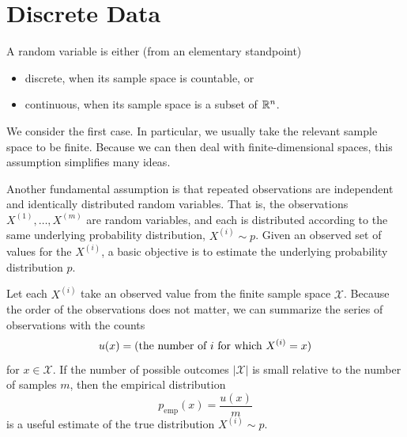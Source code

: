 \documentclass[cclicense]{hmcthesis}
\newcommand*{\x}[1]{\ensuremath{X^{(#1)}}}
\providecommand*{\xs}{\mathcal X}
\newcommand*{\emp}{\mathrm{emp}}
\numberwithin{equation}{chapter}
\numberwithin{thmcounter}{chapter}
\begin{document}
    \section{Discrete Data}

    A random variable is either (from an elementary standpoint) 
    \begin{itemize}\noparspace
    \item discrete, when its sample space is countable, or
    \item continuous, when its sample space is a subset of $\mathbb{R}^n$.
    \end{itemize}
    We consider the first case.  In particular, we usually take the relevant
    sample space to be finite.  Because we can then deal with
    finite-dimensional spaces, this assumption simplifies many ideas.

    Another fundamental assumption is that repeated observations are independent and
    identically distributed random variables.  That is, the observations $\x 1,
    \ldots, \x m$ are random variables, and each is distributed according to the
    same underlying probability distribution, $\x i \sim p$.  Given an observed
    set of values for the $\x i$, a basic objective is to estimate the
    underlying probability distribution $p$.

    Let each $\x i$ take an observed value from the finite sample space $\xs$.
    Because the order of the observations does not matter, we can summarize the
    series of observations with the counts
    \begin{equation*}
        u(x) = \pdel{\text{the number of $i$ for which $\x i = x$}}
    \end{equation*}
    for $x \in \xs$.  If the number of possible outcomes $|\xs|$ is small
    relative to the number of samples $m$, then the empirical distribution
    \begin{equation}
        p_\emp(x) = \frac{u(x)}{m}
        \label{eq:empirical}
    \end{equation}
    is a useful estimate of the true distribution $\x i \sim p$.
\end{document}
